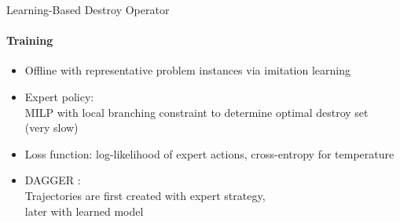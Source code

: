 \documentclass[aspectratio=1610]{beamer}
\newcommand{\important}[1]{{\color{green!60!black}#1}}
\begin{document}

\begin{frame}{Learning-Based Destroy Operator}
    \framesubtitle{Training}
	\begin{itemize}
		\itemsep 2ex
		\item Offline with representative problem instances via \important{imitation learning}
		\item \important{Expert policy:}\\
		MILP with local branching constraint to determine optimal destroy set\\(very slow)
		\item \important{Loss function}: log-likelihood of expert actions,
		cross-entropy for temperature
		\item \important{DAGGER \citep{ross2011reduction}}:\\
		Trajectories are first created with expert strategy,\\
		later with learned model
	\end{itemize}
\end{frame}
\end{document}
